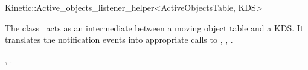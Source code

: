 

\begin{ccRefClass}{Kinetic::Active_objects_listener_helper<ActiveObjectsTable, KDS>}  %


\ccDefinition
  
The class \ccRefName\ acts as an intermediate between a moving object
table and a KDS. It translates the
 notification events into
appropriate calls to , ,
.



\ccSeeAlso

,
.


\end{ccRefClass}


